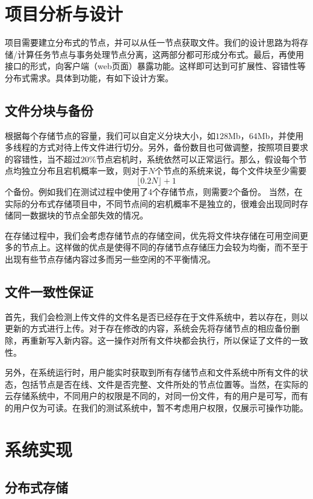 \documentclass[12pt,a4paper]{article}
\begin{document}
\section{项目分析与设计}
项目需要建立分布式的节点，并可以从任一节点获取文件。我们的设计思路为将存储/计算任务节点与事务处理节点分离，这两部分都可形成分布式。最后，再使用接口的形式，向客户端（web页面）暴露功能。这样即可达到可扩展性、容错性等分布式需求。具体到功能，有如下设计方案。
\subsection{文件分块与备份}
根据每个存储节点的容量，我们可以自定义分块大小，如$128$Mb，$64$Mb，并使用多线程的方式对待上传文件进行切分。另外，备份数目也可做调整，按照项目要求的容错性，当不超过$20\%$节点宕机时，系统依然可以正常运行。那么，假设每个节点均独立分布且宕机概率一致，则对于$N$个节点的系统来说，每个文件块至少需要
\begin{equation}
\lfloor 0.2N \rfloor+1
\end{equation}
个备份。例如我们在测试过程中使用了4个存储节点，则需要$2$个备份。 当然，在实际的分布式存储项目中，不同节点间的宕机概率不是独立的，很难会出现同时存储同一数据块的节点全部失效的情况。

在存储过程中，我们会考虑存储节点的存储空间，优先将文件块存储在可用空间更多的节点上。这样做的优点是使得不同的存储节点存储压力会较为均衡，而不至于出现有些节点存储内容过多而另一些空闲的不平衡情况。
\subsection{文件一致性保证}
首先，我们会检测上传文件的文件名是否已经存在于文件系统中，若以存在，则以更新的方式进行上传。对于存在修改的内容，系统会先将存储节点的相应备份删除，再重新写入新内容。这一操作对所有文件块都会执行，所以保证了文件的一致性。

另外，在系统运行时，用户能实时获取到所有存储节点和文件系统中所有文件的状态，包括节点是否在线、文件是否完整、文件所处的节点位置等。当然，在实际的云存储系统中，不同用户的权限是不同的，对同一份文件，有的用户是可写，而有的用户仅为可读。在我们的测试系统中，暂不考虑用户权限，仅展示可操作功能。

\section{系统实现}
\subsection{分布式存储}
\end{document}

